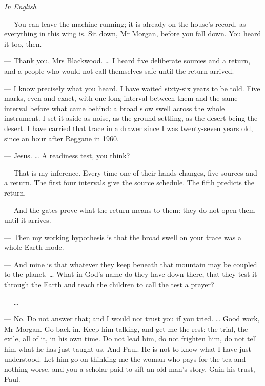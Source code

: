 \begin{room}

\textit{In English}

--- You can leave the machine running; it is already on the house's record, as everything in this wing is. Sit down, Mr Morgan, before you fall down. You heard it too, then.

--- Thank you, Mrs Blackwood. \ldots{} I heard five deliberate sources and a return, and a people who would not call themselves safe until the return arrived. 

--- I know precisely what you heard. I have waited sixty-six years to be told. Five marks, even and exact, with one long interval between them and the same interval before what came behind: a broad slow swell across the whole instrument. I set it aside as noise, as the ground settling, as the desert being the desert. I have carried that trace in a drawer since I was twenty-seven years old, since an hour after Reggane in 1960.

--- Jesus. \ldots{} A readiness test, you think?

--- That is my inference. Every time one of their hands changes, five sources and a return. The first four intervals give the source schedule. The fifth predicts the return.

--- And the gates prove what the return means to them: they do not open them until it arrives.

--- Then my working hypothesis is that the broad swell on your trace was a whole-Earth mode.

--- And mine is that whatever they keep beneath that mountain may be coupled to the planet. \ldots{} What in God's name do they have down there, that they test it through the Earth and teach the children to call the test a prayer?

--- \ldots{}

--- No. Do not answer that; and I would not trust you if you tried. \ldots{} Good work, Mr Morgan. Go back in. Keep him talking, and get me the rest: the trial, the exile, all of it, in his own time. Do not lead him, do not frighten him, do not tell him what he has just taught us. And Paul. He is not to know what I have just understood. Let him go on thinking me the woman who pays for the tea and nothing worse, and you a scholar paid to sift an old man's story. Gain his trust, Paul.

\end{room}

